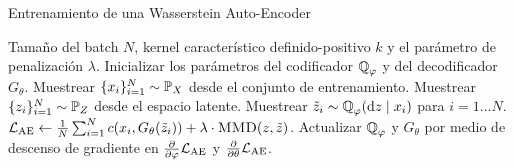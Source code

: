\begin{algorithm}[th!]
	\caption{Entrenamiento de una Wasserstein Auto-Encoder}\label{alg:WAE}
	\begin{algorithmic}[1]
		\Require Tamaño del batch $N$, kernel característico definido-positivo $k$ y el parámetro de penalización $\lambda$.
		\State{}
		\EndFunction
		\State Inicializar los parámetros del codificador $\ProbQ_\varphi$ y del decodificador $G_\theta$.
		\State Muestrear $\{x_i\}_{i=1}^{N} \sim \Prob_X$ desde el conjunto de entrenamiento.
		\State Muestrear $\{z_i\}_{i=1}^{N} \sim \Prob_Z$ desde el espacio latente.
		\State Muestrear $\tilde z_i \sim \ProbQ_\varphi(\dd z \mid x_i)$ para $i=1\dots N$.
		\State $\cL_{\mathrm{AE}} \gets \frac{1}{N}\sum_{i=1}^{N} c(x_i, G_\theta(\tilde z_i)) + \lambda \cdot \Call{MMD}{z, \tilde z}$.
		\State Actualizar $\ProbQ_\varphi$ y $G_\theta$ por medio de descenso de gradiente en $\pdv{\varphi} \cL_{\mathrm{AE}}$ y $\pdv{\theta} \mathcal{L}_{\mathrm{AE}}$.
		\EndWhile
	\end{algorithmic}
\end{algorithm}